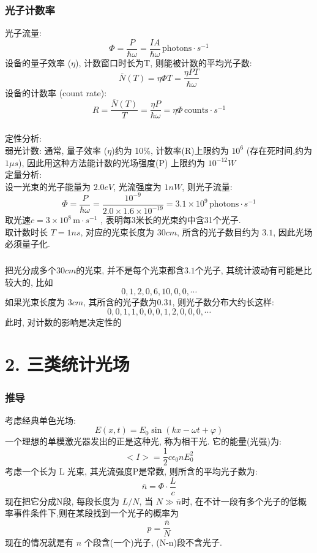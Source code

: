 \begin{frame}
 \frametitle{光子计数率}
    光子流量: 
 \[ \varPhi =  \frac{P}{\hbar \omega} = \frac{I A}{\hbar \omega} \, \text{photons} \cdot s^{-1}  \]
    设备的量子效率 ($\eta$), 计数窗口时长为T, 则能被计数的平均光子数: 
    \[\overline{N}(T)=\eta \varPhi T=\frac{\eta P T}{\hbar \omega}\]
    设备的计数率 (count rate): 
    \[ R= \frac{\overline{N}(T)}{T} = \frac{ \eta P }{\hbar \omega} = \eta\varPhi \, \text{counts} \cdot s^{-1} \]
\end{frame}

\begin{frame}
 \frametitle{}
 定性分析: \\ {\vspace*{0.6em}}
      弱光计数:  通常, 量子效率 ($\eta$)约为 10\%, 计数率(R)上限约为 $10^6$ (存在死时间,约为 $1\mu s$), 因此用这种方法能计数的光场强度(P) 上限约为 $10^{-12} W $  \\  {\vspace*{0.6em}}
 定量分析: \\ {\vspace*{0.6em}}
      设一光束的光子能量为 $2.0 eV$, 光流强度为 $1 nW$, 则光子流量: 
      \[ \varPhi =  \frac{P}{\hbar \omega} = \frac{10^{-9}}{2.0 \times 1.6 \times 10^{-19}} = 3.1 \times 10^{9} \, \text{photons} \cdot s^{-1}  \]
      取光速$c=3\times 10 ^8 \, \text{m} \cdot s^{-1} $ , 表明每3米长的光束约中含31个光子. \\ 
      取计数时长 $T= 1 ns$, 对应的光束长度为 $30 cm$, 所含的光子数目约为 $3.1$, 因此光场必须量子化. \\ 
\end{frame}

\begin{frame}
      \frametitle{}
      把光分成多个$30 cm$的光束, 并不是每个光束都含$3.1$个光子, 其统计波动有可能是比较大的, 比如 \\
      \[ 0, 1, 2, 0, 6, 10, 0, 0, \cdots  \]
      如果光束长度为 $3 cm$, 其所含的光子数为$0.31$, 则光子数分布大约长这样:
      \[0,0,1, 1, 0, 0, 0, 1, 2, 0, 0, 0, \cdots \]
      此时, {\color{red}{光子的统计分布}}对计数的影响是决定性的
\end{frame}

\section{ 2. 三类统计光场}

\begin{frame}
 \frametitle{推导}
      考虑经典单色光场: 
      \[ E(x,t) = E_0 \sin (k x - \omega t + \varphi )\]
      一个理想的单模激光器发出的正是这种光, 称为相干光. 它的能量(光强)为:
      \[ <I> = \frac{1}{2} c \epsilon_0 n E_0 ^2\]
      考虑一个长为 L 光束, 其光流强度P是常数, 则所含的平均光子数为:
      \[\overline{n} = \varPhi \cdot \frac{L}{c} \]
      现在把它分成N段, 每段长度为 $L/N$, 当 $N\gg \overline{n} $时, 在不计一段有多个光子的低概率事件条件下,则在某段找到一个光子的概率为 
      \[ p= \frac{\overline{n}}{N} \] 
      现在的情况就是有 $n$ 个段含(一个)光子, (N-n)段不含光子. 
\end{frame}

